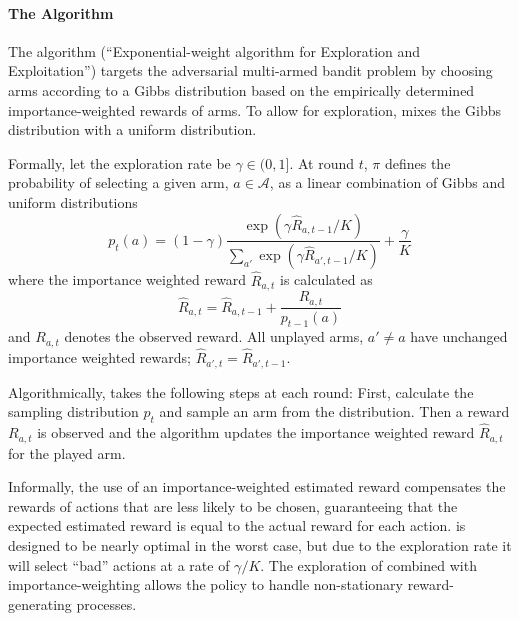 \paragraph{The \ex{} Algorithm}
The \ex{} algorithm (``Exponential-weight algorithm for Exploration and Exploitation'') targets the adversarial multi-armed bandit problem \citet{auer2002nonstochastic} by choosing arms according to a Gibbs distribution based on the empirically determined importance-weighted rewards of arms. To allow for exploration, \ex{} mixes the Gibbs distribution with a uniform distribution.

Formally, let the exploration rate be $\gamma \in (0,1]$. At round $t$, $\pi$ defines the probability of selecting a given arm, $a\in\mathcal{A}$, as a linear combination of Gibbs and uniform distributions
\begin{equation}
\label{eq:exp3_sampling}
    p_{t}(a) = (1-\gamma)\dfrac{\exp(\gamma\hat{R}_{a,t-1}/K)}{\sum_{a\prime}\exp(\gamma \hat{R}_{a\prime,t-1}/K)}+\frac{\gamma}{K}
\end{equation}
where the importance weighted reward $\hat{R}_{a,t}$ is calculated as 
\begin{equation}
\label{eq:importance_weighted_reward}
    \hat{R}_{a,t} = \hat{R}_{a,t-1} + \frac{R_{a,t}}{p_{t-1}(a)}
\end{equation}
and $R_{a,t}$ denotes the observed reward. All unplayed arms, $a\prime\neq a$ have unchanged importance weighted rewards; $\hat{R}_{a\prime,t}=\hat{R}_{a\prime,t-1}$.

Algorithmically, \ex{} takes the following steps at each round: First, calculate the sampling distribution $p_{t}$ and sample an arm from the distribution. Then a reward $R_{a,t}$ is observed and the algorithm updates the importance weighted reward $\hat{R}_{a,t}$ for the played arm.

Informally, the use of an importance-weighted estimated reward compensates the rewards of actions that are less likely to be chosen, guaranteeing that the expected estimated reward is equal to the actual reward for each action. \ex{} is designed to be nearly optimal in the worst case, but due to the exploration rate it will select ``bad'' actions at a rate of $\gamma / K$. The exploration of \ex{} combined with importance-weighting allows the policy to handle non-stationary reward-generating processes.

